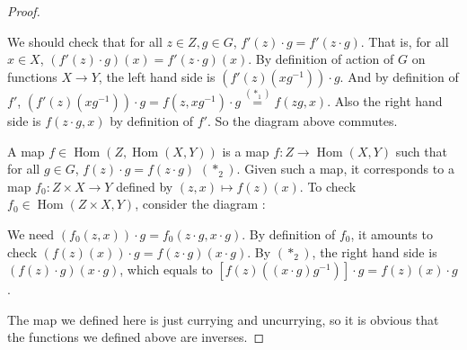 \documentclass[a4paper]{article}
\DeclareMathOperator{\Hom}{\text {Hom}}
\begin{document}
\begin{question}
\begin{proof}
\begin{center}
\begin{tikzcd}
            \end{tikzcd}
        \end{center}
        We should check that for all $z\in Z,g\in G$, $f'(z)\cdot g = f'(z\cdot g)$. That is, for all $x\in X$, $(f'(z)\cdot g)(x)=f'(z\cdot g)(x)$. By definition of action of $G$ on functions $X\to Y$, the left hand side is $(f'(z)(xg^{-1}))\cdot g$. And by definition of $f'$, $(f'(z)(xg^{-1}))\cdot g = f(z,xg^{-1})\cdot g\overset{(*_1)} = f(zg,x)$. Also the right hand side is $f(z\cdot g,x)$ by definition of $f'$. So the diagram above commutes.

        A map $f\in\Hom (Z, \Hom(X,Y))$ is a map $f:Z\to \Hom(X,Y)$ such that for all $g\in G$, $f(z)\cdot g = f(z\cdot g)$ $(*_2)$. Given such a map, it corresponds to a map $f_0:Z\times X\to Y$ defined by $(z,x)\mapsto f(z)(x)$. To check $f_0\in\Hom(Z\times X,Y)$, consider the diagram :
        \begin{center}
        \end{center}
        We need $(f_0(z,x))\cdot g = f_0(z\cdot g,x \cdot g)$. By definition of $f_0$, it amounts to check $(f(z)(x))\cdot g = f(z\cdot g)(x\cdot g)$. By $(*_2)$, the right hand side is $(f(z)\cdot g)(x\cdot g)$, which equals to $[f(z)((x\cdot g)g^{-1})]\cdot g = f(z)(x)\cdot g$.

        The map we defined here is just currying and uncurrying, so it is obvious that the functions we defined above are inverses.
    \end{proof}
\end{question}
\end{document}
